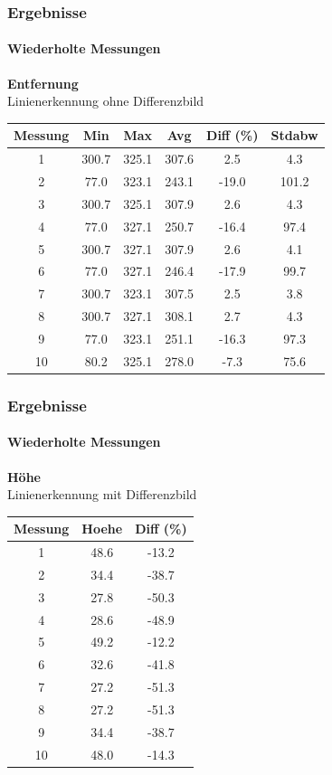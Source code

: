 \documentclass[xcolor=dvipsnames]{beamer}
\begin{document}
\begin{frame}
	\frametitle{Ergebnisse}
	\framesubtitle{Wiederholte Messungen}
		\textbf{Entfernung}\\
	
		Linienerkennung ohne Differenzbild
		\begin{tabular}{c|c|c|c|c|c}
			Messung & Min & Max & Avg & Diff (\%) & Stdabw \\ \hline
1 & 300.7 & 325.1 & 307.6 & 2.5 & 4.3\\
2 & 77.0 & 323.1 & 243.1 & -19.0 & 101.2\\
3 & 300.7 & 325.1 & 307.9 & 2.6 & 4.3\\
4 & 77.0 & 327.1 & 250.7 & -16.4 & 97.4\\
5 & 300.7 & 327.1 & 307.9 & 2.6 & 4.1\\
6 & 77.0 & 327.1 & 246.4 & -17.9 & 99.7\\
7 & 300.7 & 323.1 & 307.5 & 2.5 & 3.8\\
8 & 300.7 & 327.1 & 308.1 & 2.7 & 4.3\\
9 & 77.0 & 323.1 & 251.1 & -16.3 & 97.3\\
10 & 80.2 & 325.1 & 278.0 & -7.3 & 75.6
		\end{tabular}
	
\end{frame}

\begin{frame}
	\frametitle{Ergebnisse}
	\framesubtitle{Wiederholte Messungen}
		\textbf{Höhe}\\
		
		Linienerkennung mit Differenzbild
		\begin{tabular}{c|c|c}
			Messung & Hoehe & Diff (\%) \\ \hline
1 & 48.6 & -13.2 \\
2 & 34.4 & -38.7 \\
3 & 27.8 & -50.3 \\
4 & 28.6 & -48.9 \\
5 & 49.2 & -12.2 \\
6 & 32.6 & -41.8 \\
7 & 27.2 & -51.3 \\
8 & 27.2 & -51.3 \\
9 & 34.4 & -38.7 \\
10 & 48.0 & -14.3\\

		\end{tabular}
		
		
\end{frame}
\end{document}
